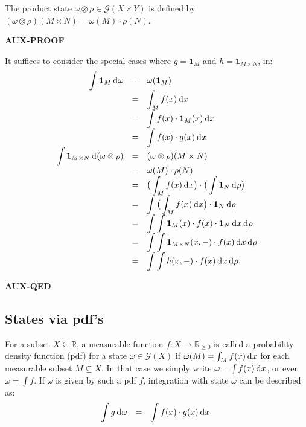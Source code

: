 \documentclass{mscs}
\newcommand{\auxprooffont}{\small}
\newenvironment{Auxproof}
  {\par\auxprooffont\noindent\textbf{AUX-PROOF}\dotfill\par
    \noindent\ignorespaces}
  {\par\noindent\textbf{AUX-QED}\dotfill\par
    \noindent\ignorespacesafterend}
\newcommand{\Giry}{\mathcal{G}}
\newcommand{\R}{\mathbb{R}}
\newcommand{\intd}{{\kern.2em}\mathrm{d}{\kern.03em}}
\newcommand{\indic}[1]{\mathbf{1}_{#1}}
\begin{document}
\noindent The product state $\omega\otimes\rho \in \Giry(X\times Y)$
is defined by $(\omega\otimes\rho)(M\times N) =
\omega(M)\cdot\rho(N)$.

\begin{Auxproof}
It suffices to consider the special cases where $g = \indic{M}$ and
$h = \indic{M\times N}$, in:
\[ \begin{array}{rcl}
\displaystyle \int \indic{M} \intd \omega
& = &
\omega(\indic{M})
\\
& = &
\displaystyle \int_{M} f(x)\intd x
\\
& = &
\displaystyle\int f(x) \cdot \indic{M}(x) \intd x
\\
& = &
\displaystyle\int f(x) \cdot g(x) \intd x
\\
\displaystyle \int \indic{M\times N} \intd (\omega\otimes\rho)
& = &
(\omega\otimes\rho)(M\times N)
\\
& = &
\omega(M) \cdot \rho(N)
\\
& = &
\big(\displaystyle\int_{M} f(x) \intd x\big)\cdot 
   \big(\displaystyle \int \indic{N} \intd \rho\big)
\\
& = &
\displaystyle \int \big(\displaystyle\int_{M} f(x) \intd x\big)\cdot \indic{N} 
   \intd \rho
\\
& = &
\displaystyle \int \int \indic{M}(x)\cdot f(x)\cdot \indic{N}  \intd x
   \intd \rho
\\
& = &
\displaystyle \int \int \indic{M\times N}(x,-)\cdot f(x) \intd x \intd \rho
\\
& = &
\displaystyle \int \int h(x,-)\cdot f(x) \intd x \intd \rho.
\end{array} \]
\end{Auxproof}




\subsection{States via pdf's}\label{subsec:stateviapdf}

For a subset $X\subseteq \R$, a measurable function $f\colon X
\rightarrow \R_{\geq 0}$ is called a probability density function
(pdf) for a state $\omega\in\Giry(X)$ if $\omega(M) = \int_{M} f(x)
\intd x$ for each measurable subset $M\subseteq X$. In that case we
simply write $\omega = \int f(x) \intd x$, or even $\omega = \int
f$. If $\omega$ is given by such a pdf $f$, integration with state
$\omega$ can be described as:
\begin{equation}
\label{eqn:pdfintegration}
\begin{array}{rcl}
\displaystyle\int g \intd \omega
& = &
\displaystyle\int f(x)\cdot g(x) \intd x.
\end{array}
\end{equation}
\end{document}
